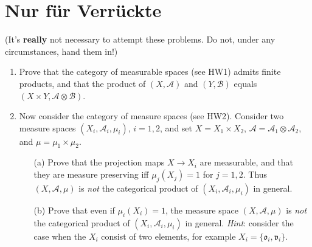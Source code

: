 \documentclass[lang=cn,11pt]{elegantbook}
\begin{document}
\section{Nur f\"ur Verr\"uckte}
(It's \textbf{really} not necessary to attempt these problems. Do not, under any circumstances, hand them in!)
\begin{enumerate}
\item Prove that the category of measurable spaces (see HW1) admits finite products, and that the product of $(X,\mathcal{A})$ and $(Y,\mathcal{B})$ equals $(X\times Y,\mathcal{A}\otimes\mathcal{B})$. 
\item Now consider the category of measure spaces (see HW2). Consider two 
  measure spaces $(X_i,\mathcal{A}_i,\mu_i)$, $i=1,2$, and set $X=X_1\times X_2$, $\mathcal{A}=\mathcal{A}_1\otimes \mathcal{A}_2$, and $\mu=\mu_1\times\mu_2$.
  \begin{itemize}
  \item[(a)]Prove that the projection maps $X\to X_i$ are measurable, and that they are measure preserving iff $\mu_j(X_j)=1$ for $j=1,2$. Thus $(X,\mathcal{A},\mu)$ is \emph{not} the categorical product of $(X_i,\mathcal{A}_i,\mu_i)$ in general.
  \item[(b)]Prove that even if $\mu_i(X_i)=1$, the measure space $(X,\mathcal{A},\mu)$ is \emph{not} the categorical product of $(X_i,\mathcal{A}_i,\mu_i)$ in general.
    \textit{Hint}: consider the case when the $X_i$ consist of two elements, for example $X_i=\{\mathfrak{o}_i,\mathfrak{v}_i\}$.
  \end{itemize}
\end{enumerate}
\end{document}
